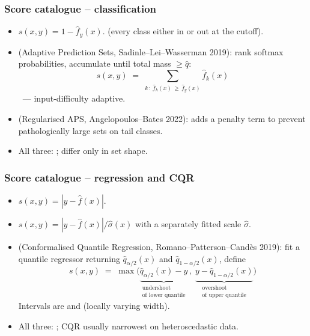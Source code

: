 \documentclass[11pt, aspectratio=169, xcolor={dvipsnames}, usepdftitle=false]{beamer}
\begin{document}
\begin{frame}
\frametitle{Score catalogue -- classification}
\begin{itemize}
\item {} $s(x, y) = 1 - \hat{f}_y(x)$.  (every class either in or out at the cutoff).
\item {} (Adaptive Prediction Sets, Sadinle--Lei--Wasserman 2019): rank softmax probabilities, accumulate until total mass $\geq \hat{q}$:
\begin{equation*}
s(x, y) \;=\; \sum_{k \,:\, \hat{f}_k(x) \,\geq\, \hat{f}_y(x)} \hat{f}_k(x)
\end{equation*}
\quad {}~--- input-difficulty adaptive.
\item {} (Regularised APS, Angelopoulos--Bates 2022): adds a penalty term to prevent pathologically large sets on tail classes.
\item All three: ; differ only in set shape.
\end{itemize}
\end{frame}

\begin{frame}
\frametitle{Score catalogue -- regression and CQR}
\begin{itemize}
\item {} $s(x, y) = |y - \hat{f}(x)|$. 
\item {} $s(x, y) = |y - \hat{f}(x)| / \hat{\sigma}(x)$ with a separately fitted scale $\hat{\sigma}$. 
\item {} (Conformalised Quantile Regression, Romano--Patterson--Cand\`es 2019): fit a quantile regressor returning $\hat{q}_{\alpha/2}(x)$ and $\hat{q}_{1-\alpha/2}(x)$, define
\begin{equation*}
s(x, y) \;=\;
\max\bigl(
\underbrace{\hat{q}_{\alpha/2}(x) - y}_{\substack{\text{undershoot}\\\text{of lower quantile}}}
\,,\;
\underbrace{y - \hat{q}_{1-\alpha/2}(x)}_{\substack{\text{overshoot}\\\text{of upper quantile}}}
\bigr)
\end{equation*}
\quad Intervals are  and  (locally varying width).
\item All three: ; CQR usually narrowest on heteroscedastic data.
\end{itemize}
\end{frame}
\end{document}
